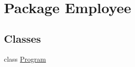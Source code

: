 \hypertarget{namespace_employee}{\section{Package Employee}
\label{namespace_employee}
}
\subsection*{Classes}
\begin{DoxyCompactItemize}
\item 
class \hyperlink{class_employee_1_1_program}{Program}
\end{DoxyCompactItemize}
